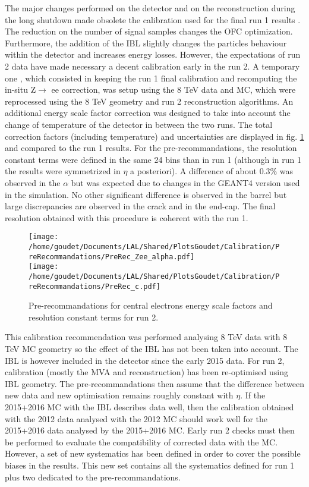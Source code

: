 \label{sec:Calibration_inSitu_secPreRec}
The major changes performed on the detector and on the reconstruction during the long shutdown made obsolete the calibration used for the final run 1 results \cite{CERN-PH-EP-2014-153}.
The reduction on the number of signal samples changes the OFC optimization.
Furthermore, the addition of the IBL slightly changes the particles behaviour within the detector and increases energy losses.
However, the expectations of run 2 data have made necessary a decent calibration early in the run 2.
A temporary one \cite{ATL-COM-PHYS-2015-1300,ATL-COM-PHYS-2016-841,ATL-COM-PHYS-2017-757}, which consisted in keeping the run 1 final calibration and recomputing the in-situ Z\(\rightarrow\) ee correction, was setup using the 8 TeV data and MC, which were reprocessed using the 8 TeV geometry and run 2 reconstruction algorithms.
An additional energy scale factor correction was designed to take into account the change of temperature of the detector in between the two runs.
The total correction factors (including temperature) and uncertainties are displayed in fig. \ref{orgb377ac3} and compared to the run 1 results.
For the pre-recommandations, the resolution constant terms were defined in the same 24 bins than in run 1 (although in run 1 the results were symmetrized in $\eta$ a posteriori).
A difference of about 0.3\% was observed in the $\alpha$ but was expected due to changes in the GEANT4 version used in the simulation.
No other significant difference is observed in the barrel but large discrepancies are observed in the crack and in the end-cap.
The final resolution obtained with this procedure is coherent with the run 1.

\begin{figure}
  \centering
\texttt{[image: /home/goudet/Documents/LAL/Shared/PlotsGoudet/Calibration/PreRecommandations/PreRec\_Zee\_alpha.pdf]}\\
\texttt{[image: /home/goudet/Documents/LAL/Shared/PlotsGoudet/Calibration/PreRecommandations/PreRec\_c.pdf]}
\caption{\label{orgb377ac3}
Pre-recommandations for central electrons energy scale factors and resolution constant terms for run 2.}
\end{figure}

This calibration recommendation was performed analysing 8 TeV data with 8 TeV MC geometry so the effect of the IBL has not been taken into account.
The IBL is however included in the detector since the early 2015 data.
For run 2, calibration (mostly the MVA and reconstruction) has been re-optimised using IBL geometry.
The pre-recommandations then assume that the difference between new data and new optimisation remains roughly constant with $\eta$.
If the 2015+2016 MC with the IBL describes data well, then the calibration obtained with the 2012 data analysed with the 2012 MC should work well for the 2015+2016 data analysed by the 2015+2016 MC.
Early run 2 checks must then be performed to evaluate the compatibility of corrected data with the MC.
However, a set of new systematics has been defined in order to cover the possible biases in the results.
This new set contains all the systematics defined for run 1 plus two dedicated to the pre-recommandations.

